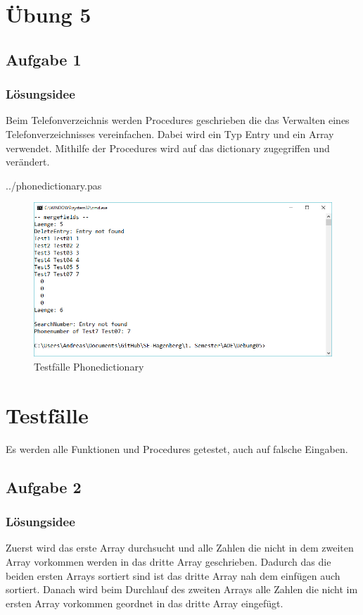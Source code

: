 \section*{Übung 5}
\subsection*{Aufgabe 1}
\subsubsection*{Lösungsidee}
Beim Telefonverzeichnis werden Procedures geschrieben die das Verwalten eines Telefonverzeichnisses vereinfachen. Dabei wird ein Typ Entry und ein Array verwendet. Mithilfe der Procedures wird auf das dictionary zugegriffen und verändert.
\newline

 {../phonedictionary.pas}
\begin{figure}[H]
	\centering
	\includegraphics[scale=0.75]{./pictures/phonedictionary.png}
	\caption{Testfälle Phonedictionary}
	\label{fig: phonedictionary}
\end{figure}

\section*{Testfälle}
Es werden alle Funktionen und Procedures getestet, auch auf falsche Eingaben.

\newpage

\subsection*{Aufgabe 2}
\subsubsection*{Lösungsidee}
Zuerst wird das erste Array durchsucht und alle Zahlen die nicht in dem zweiten Array vorkommen werden in das dritte Array geschrieben. Dadurch das die beiden ersten Arrays sortiert sind ist das dritte Array nah dem einfügen auch sortiert. Danach wird beim Durchlauf des zweiten Arrays alle Zahlen die nicht im ersten Array vorkommen geordnet in das dritte Array eingefügt.
\newline


